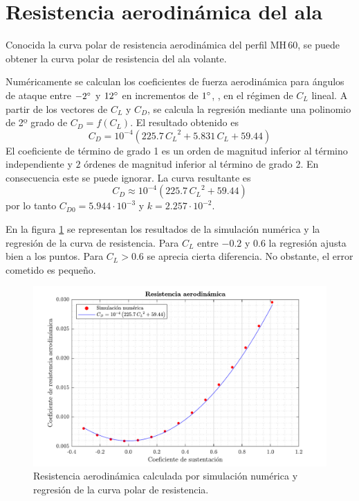 
\section{Resistencia aerodinámica del ala}

Conocida la curva polar de resistencia aerodinámica del perfil $\mathrm{MH}\,60$, se puede obtener la curva polar de resistencia del ala volante.

Numéricamente se calculan los coeficientes de fuerza aerodinámica para ángulos de ataque entre $-2\mathrm{^{\circ}}$ y $12\mathrm{^{\circ}}$ en incrementos de $1\mathrm{^{\circ}}$, \ie, en el régimen de $C_L$ lineal. A partir de los vectores de $C_L$ y $C_D$, se calcula la regresión mediante una polinomio de 2º grado de $C_D = f \left( C_L \right)$. El resultado obtenido es
\begin{equation}
    C_D = 10^{-4} \left( 225.7 \, {C_L}^2 + 5.831 \, C_L + 59.44 \right)
\end{equation}
El coeficiente de término de grado 1 es un orden de magnitud inferior al término independiente y $2$ órdenes de magnitud inferior al término de grado 2. En consecuencia este se puede ignorar. La curva resultante es
\begin{equation} \label{eq:curva_polar_ala}
    C_D \approx 10^{-4} \left( 225.7 \, {C_L}^2 + 59.44 \right)
\end{equation}
por lo tanto $C_{D0} = 5.944 \cdot 10^{-3}$ y $k = 2.257 \cdot 10^{-2}$.

En la figura \ref{fig:drag_regression} se representan los resultados de la simulación numérica y la regresión de la curva de resistencia. Para $C_L$ entre $-0.2$ y $0.6$ la regresión ajusta bien a los puntos. Para $C_L > 0.6$ se aprecia cierta diferencia. No obstante, el error cometido es pequeño. 

\begin{figure}[h]
    \centering
    \includegraphics[width=\linewidth]{imagenes/drag_ala/drag_regression.pdf}
    \caption{Resistencia aerodinámica calculada por simulación numérica y regresión de la curva polar de resistencia.}
    \label{fig:drag_regression}
    \vspace{-4mm}
\end{figure}
